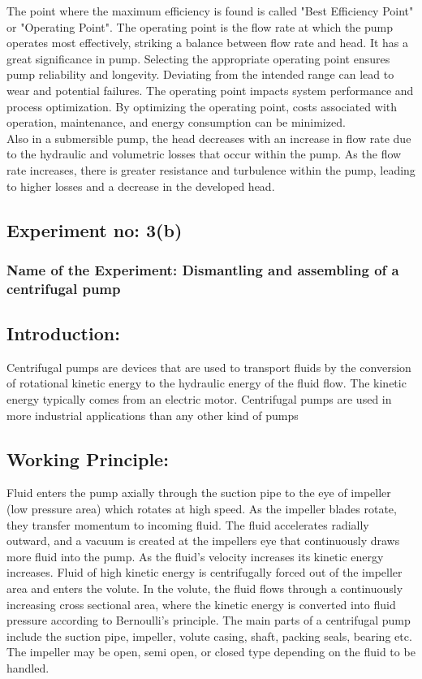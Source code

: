 \documentclass[12pt]{article}
\begin{document}
The point where the maximum efficiency is found is called "Best Efficiency Point" or "Operating Point". The operating point is the flow rate at which the pump operates most effectively, striking a balance between flow rate and head. It has a great significance in pump. Selecting the appropriate operating point ensures pump reliability and longevity. Deviating from the intended range can lead to wear and potential failures. The operating point impacts system performance and process optimization. By optimizing the operating point, costs associated with operation, maintenance, and energy consumption can be minimized.\\

Also in a submersible pump, the head decreases with an increase in flow rate due to the hydraulic and volumetric losses that occur within the pump. As the flow rate increases, there is greater resistance and turbulence within the pump, leading to higher losses and a decrease in the developed head.

\pagebreak

\subsection*{Experiment no: 3(b)}
\subsubsection*{Name of the Experiment:  Dismantling and assembling of a centrifugal pump} 
\vspace*{0.2cm}

\subsection*{Introduction:}
Centrifugal pumps are devices that are used to transport fluids by the conversion of rotational kinetic energy to the hydraulic energy of the fluid flow. The kinetic energy typically comes 
from an electric motor. Centrifugal pumps are used in more industrial applications than any other kind of pumps

\subsection*{Working Principle:}
Fluid enters the pump axially through the suction pipe to the eye of impeller (low pressure area) which rotates at high speed. As the impeller blades rotate, they transfer momentum to incoming fluid. The fluid accelerates radially outward, and a vacuum is created at the impellers eye that continuously draws more fluid into the pump. As the fluid's velocity increases its kinetic energy increases. Fluid of high kinetic energy is centrifugally forced out of the impeller area and enters the volute. In the volute, the fluid flows through a continuously increasing cross sectional area, where the kinetic energy is converted into fluid pressure according to Bernoulli's principle. The main parts of a centrifugal pump include the suction pipe, impeller, volute casing, shaft, packing seals, bearing etc. The impeller may be open, semi open, or closed 
type depending on the fluid to be handled. 
\end{document}
